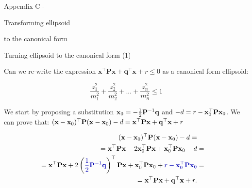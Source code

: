 \documentclass{beamer}
\begin{document}
\begin{frame}
	\centerline{\huge Appendix C -}
	
	\bigskip
	
	\centerline{\huge Transforming ellipsoid}
	\centerline{\huge to the canonical form}
\end{frame}




\begin{frame}{Turning ellipsoid to the canonical form (1)}
	\begin{flushleft}
		
		Can we re-write the expression $\mathbf{x}^\top \mathbf{P} \mathbf{x} + \mathbf{q}^\top\mathbf{x} + r \leq 0$ as a canonical form ellipsoid:
		
		\begin{equation}
			\frac{z_1^2}{m_1^2} + \frac{z_2^2}{m_2^2} + ... + 
			\frac{z_n^2}{m_n^2} \leq 1
		\end{equation}
		
		We start by proposing a substitution $\mathbf{x}_0 = - \frac{1}{2}\mathbf{P}^{-1}\mathbf{q}$ and $-d = r - \mathbf{x}_0^\top \mathbf{P} \mathbf{x}_0$. We can prove that: $(\mathbf{x} - \mathbf{x}_0)^\top \mathbf{P}(\mathbf{x} - \mathbf{x}_0) - d =
		\mathbf{x}^\top \mathbf{P} \mathbf{x} + \mathbf{q}^\top\mathbf{x} + r$
		
		\begin{align}
			(\bo{x} - \bo{x}_0)\T \bo{P}(\bo{x} - \bo{x}_0) - d =
			\\
			= \bo{x}\T\bo{P}\bo{x} - 2\bo{x}_0\T\bo{P}\bo{x} + \bo{x}_0\T\bo{P}\bo{x}_0 - d &=
			\\
			= \bo{x}\T\bo{P}\bo{x} + 2\left(\textcolor{mydarkblue}{\frac{1}{2}\bo{P}^{-1}\bo{q}}\right)\T\bo{P}\bo{x} + \bo{x}_0\T\bo{P}\bo{x}_0 + \textcolor{mydarkblue}{r - \bo{x}_0\T \bo{P} \bo{x}_0} &=
			\\
			= \bo{x}\T\bo{P}\bo{x} + \bo{q}\T \bo{x} + r.
		\end{align}
		
	\end{flushleft}
\end{frame}
\end{document}
